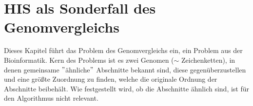 






\section{HIS als Sonderfall des Genomvergleichs \cite{ohlebusch}}

Dieses Kapitel führt das Problem des Genomvergleichs ein, ein Problem aus der Bioinformatik. Kern des Problems ist es zwei Genomen ($\sim$ Zeichenketten), in denen gemeinsame $"$ähnliche$"$ Abschnitte bekannt sind, diese gegenüberzustellen und eine größte Zuordnung zu finden, welche die originale Ordnung der Abschnitte beibehält. Wie festgestellt wird, ob die Abschnitte ähnlich sind, ist für den Algorithmus nicht relevant. 

